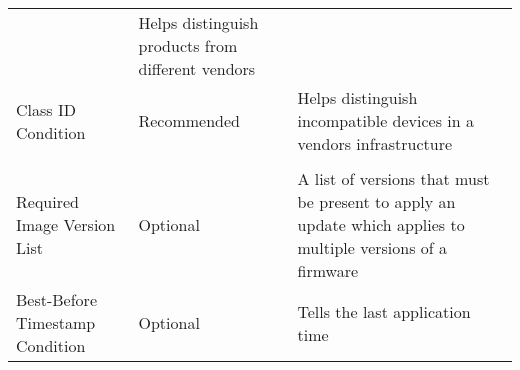 \documentclass[0-thesis.tex]{subfiles}
\begin{document}
\begin{longtable}[]{@{}lll@{}}
\begin{minipage}[t]{0.26\columnwidth}
    \end{minipage} & \begin{minipage}[t]{0.60\columnwidth}\raggedright\strut
    Helps distinguish products from different vendors\strut
    \end{minipage}\tabularnewline
    \begin{minipage}[t]{0.23\columnwidth}\raggedright\strut
    Class ID Condition\strut
    \end{minipage} & \begin{minipage}[t]{0.26\columnwidth}\raggedright\strut
    Recommended\strut
    \end{minipage} & \begin{minipage}[t]{0.60\columnwidth}\raggedright\strut
    Helps distinguish incompatible devices in a vendors infrastructure\strut
    \end{minipage}\tabularnewline
    \begin{minipage}[t]{0.23\columnwidth}\raggedright\strut
    \strut
    \end{minipage} & \begin{minipage}[t]{0.26\columnwidth}\raggedright\strut
    \strut
    \end{minipage} & \begin{minipage}[t]{0.60\columnwidth}\raggedright\strut
    \strut
    \end{minipage}\tabularnewline
    \begin{minipage}[t]{0.23\columnwidth}\raggedright\strut
    Required Image Version List\strut
    \end{minipage} & \begin{minipage}[t]{0.26\columnwidth}\raggedright\strut
    Optional\strut
    \end{minipage} & \begin{minipage}[t]{0.60\columnwidth}\raggedright\strut
    A list of versions that must be present to apply an update which applies
    to multiple versions of a firmware\strut
    \end{minipage}\tabularnewline
    \begin{minipage}[t]{0.23\columnwidth}\raggedright\strut
    Best-Before Timestamp Condition\strut
    \end{minipage} & \begin{minipage}[t]{0.26\columnwidth}\raggedright\strut
    Optional\strut
    \end{minipage} & \begin{minipage}[t]{0.60\columnwidth}\raggedright\strut
    Tells the last application time\strut

\end{minipage}
\end{longtable}
\end{document}
